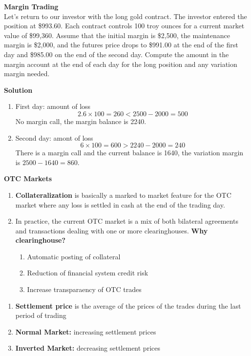 \documentclass[11pt,fleqn]{report} %
\numberwithin{equation}{section} %
\numberwithin{figure}{section} %
\numberwithin{table}{section} %
\begin{document}
\begin{exercise}\textbf{Margin Trading}\\
Let’s return to our investor with the long gold contract. The investor entered the position
at \$993.60. Each contract controls 100 troy ounces for a current market value of \$99,360.
Assume that the initial margin is \$2,500, the maintenance margin is \$2,000, and the
futures price drops to \$991.00 at the end of the first day and \$985.00 on the end of the
second day. Compute the amount in the margin account at the end of each day for the
long position and any variation margin needed.

\textbf{Solution}
\begin{enumerate}
    \item First day: amount of loss
    $$
    2.6\times 100=260<2500-2000=500
    $$
    No margin call, the margin balance is 2240.
    \item Second day: amont of loss
    $$
    6\times 100=600>2240-2000=240
    $$
    There is a margin call and the current balance is 1640, the variation margin is $2500-1640=860$.
\end{enumerate}
\end{exercise}
\begin{definition}\textbf{OTC Markets}
\begin{enumerate}
    \item \textbf{Collateralization} is basically a marked to market feature for the OTC market where any loss is settled in cash at the end of the trading day. 
    \item In practice, the current OTC
market is a mix of both bilateral agreements and transactions dealing with one or more
clearinghouses. \textbf{Why clearinghouse?}
    \begin{enumerate}
        \item Automatic posting of collateral
        \item Reduction of financial system credit risk
        \item Increase transparaency of OTC trades
    \end{enumerate}
\end{enumerate}
\end{definition}
\begin{definition}
\begin{enumerate}
    \item \textbf{Settlement price} is the average of the prices of the trades during the last period of trading
    \item \textbf{Normal Market:} increasing settlement prices
    \item \textbf{Inverted Market:} decreasing settlement prices
\end{enumerate}
\end{definition}
\end{document}
